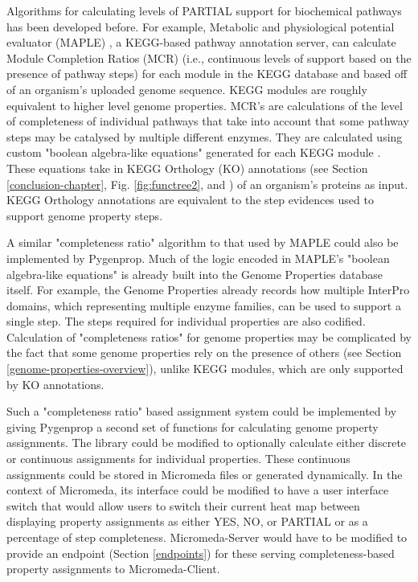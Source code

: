 Algorithms for calculating levels of PARTIAL support for biochemical pathways has been developed before. For example, Metabolic and physiological potential evaluator (MAPLE) \cite{takami2016automated}, a KEGG-based pathway annotation server, can calculate Module Completion Ratios (MCR) (i.e., continuous levels of support based on the presence of pathway steps) for each module in the KEGG database and based off of an organism's uploaded genome sequence. KEGG modules are roughly equivalent to higher level genome properties. MCR's are calculations of the level of completeness of individual pathways that take into account that some pathway steps may be catalysed by multiple different enzymes. They are calculated using custom "boolean algebra-like equations" generated for each KEGG module \cite{takami2012evaluation}. These equations take in KEGG Orthology (KO) annotations (see Section \ref{conclusion-chapter}, Fig. \ref{fig:functree2}, and \cite{mao2005automated}) of an organism's proteins as input. KEGG Orthology annotations are equivalent to the step evidences used to support genome property steps. 

A similar "completeness ratio" algorithm to that used by MAPLE could also be implemented by Pygenprop. Much of the logic encoded in MAPLE's "boolean algebra-like equations" is already built into the Genome Properties database itself. For example, the Genome Properties already records how multiple InterPro domains, which representing multiple enzyme families, can be used to support a single step. The steps required for individual properties are also codified. Calculation of "completeness ratios" for genome properties may be complicated by the fact that some genome properties rely on the presence of others (see Section \ref{genome-properties-overview}), unlike KEGG modules, which are only supported by KO annotations.

Such a "completeness ratio" based assignment system could be implemented by giving Pygenprop a second set of functions for calculating genome property assignments. The library could be modified to optionally calculate either discrete or continuous assignments for individual properties. These continuous assignments could be stored in Micromeda files or generated dynamically. In the context of Micromeda, its interface could be modified to have a user interface switch that would allow users to switch their current heat map between displaying property assignments as either YES, NO, or PARTIAL or as a percentage of step completeness. Micromeda-Server would have to be modified to provide an endpoint (Section \ref{endpoints}) for these serving completeness-based property assignments to Micromeda-Client.

